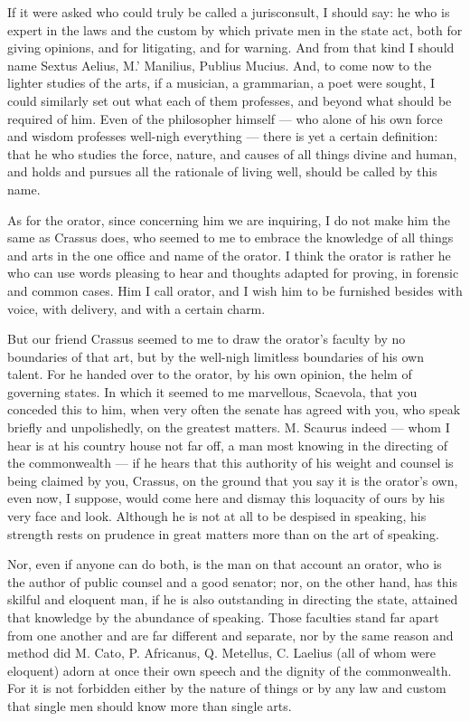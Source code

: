  If it were asked who could truly be called a jurisconsult, I should say: he who is expert in the laws and the custom by which private men in the state act, both for giving opinions, and for litigating, and for warning. And from that kind I should name Sextus Aelius, M.' Manilius, Publius Mucius. And, to come now to the lighter studies of the arts, if a musician, a grammarian, a poet were sought, I could similarly set out what each of them professes, and beyond what should be required of him. Even of the philosopher himself — who alone of his own force and wisdom professes well-nigh everything — there is yet a certain definition: that he who studies the force, nature, and causes of all things divine and human, and holds and pursues all the rationale of living well, should be called by this name.

 As for the orator, since concerning him we are inquiring, I do not make him the same as Crassus does, who seemed to me to embrace the knowledge of all things and arts in the one office and name of the orator. I think the orator is rather he who can use words pleasing to hear and thoughts adapted for proving, in forensic and common cases. Him I call orator, and I wish him to be furnished besides with voice, with delivery, and with a certain charm.

 But our friend Crassus seemed to me to draw the orator's faculty by no boundaries of that art, but by the well-nigh limitless boundaries of his own talent. For he handed over to the orator, by his own opinion, the helm of governing states. In which it seemed to me marvellous, Scaevola, that you conceded this to him, when very often the senate has agreed with you, who speak briefly and unpolishedly, on the greatest matters. M. Scaurus indeed — whom I hear is at his country house not far off, a man most knowing in the directing of the commonwealth — if he hears that this authority of his weight and counsel is being claimed by you, Crassus, on the ground that you say it is the orator's own, even now, I suppose, would come here and dismay this loquacity of ours by his very face and look. Although he is not at all to be despised in speaking, his strength rests on prudence in great matters more than on the art of speaking.

 Nor, even if anyone can do both, is the man on that account an orator, who is the author of public counsel and a good senator; nor, on the other hand, has this skilful and eloquent man, if he is also outstanding in directing the state, attained that knowledge by the abundance of speaking. Those faculties stand far apart from one another and are far different and separate, nor by the same reason and method did M. Cato, P. Africanus, Q. Metellus, C. Laelius (all of whom were eloquent) adorn at once their own speech and the dignity of the commonwealth. For it is not forbidden either by the nature of things or by any law and custom that single men should know more than single arts.

